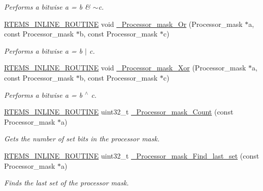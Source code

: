 \begin{DoxyCompactItemize}
\begin{DoxyCompactList}\small\item\em Performs a bitwise a = b \& $\sim$c. \end{DoxyCompactList}\item 
\mbox{\hyperlink{group__RTEMSScoreBaseDefs_gac216239df231d5dbd15e3520b0b9313f}{R\+T\+E\+M\+S\+\_\+\+I\+N\+L\+I\+N\+E\+\_\+\+R\+O\+U\+T\+I\+NE}} void \mbox{\hyperlink{group__RTEMSScoreProcessorMask_ga43996340f8cfb4a757aacec22f234719}{\+\_\+\+Processor\+\_\+mask\+\_\+\+Or}} (Processor\+\_\+mask $\ast$a, const Processor\+\_\+mask $\ast$b, const Processor\+\_\+mask $\ast$c)
\begin{DoxyCompactList}\small\item\em Performs a bitwise a = b $\vert$ c. \end{DoxyCompactList}\item 
\mbox{\hyperlink{group__RTEMSScoreBaseDefs_gac216239df231d5dbd15e3520b0b9313f}{R\+T\+E\+M\+S\+\_\+\+I\+N\+L\+I\+N\+E\+\_\+\+R\+O\+U\+T\+I\+NE}} void \mbox{\hyperlink{group__RTEMSScoreProcessorMask_ga5453b3340d17ad1912b3dea3945343fd}{\+\_\+\+Processor\+\_\+mask\+\_\+\+Xor}} (Processor\+\_\+mask $\ast$a, const Processor\+\_\+mask $\ast$b, const Processor\+\_\+mask $\ast$c)
\begin{DoxyCompactList}\small\item\em Performs a bitwise a = b $^\wedge$ c. \end{DoxyCompactList}\item 
\mbox{\hyperlink{group__RTEMSScoreBaseDefs_gac216239df231d5dbd15e3520b0b9313f}{R\+T\+E\+M\+S\+\_\+\+I\+N\+L\+I\+N\+E\+\_\+\+R\+O\+U\+T\+I\+NE}} uint32\+\_\+t \mbox{\hyperlink{group__RTEMSScoreProcessorMask_gae3fdc6e3c725a7ef67faf3bc5bd9697e}{\+\_\+\+Processor\+\_\+mask\+\_\+\+Count}} (const Processor\+\_\+mask $\ast$a)
\begin{DoxyCompactList}\small\item\em Gets the number of set bits in the processor mask. \end{DoxyCompactList}\item 
\mbox{\hyperlink{group__RTEMSScoreBaseDefs_gac216239df231d5dbd15e3520b0b9313f}{R\+T\+E\+M\+S\+\_\+\+I\+N\+L\+I\+N\+E\+\_\+\+R\+O\+U\+T\+I\+NE}} uint32\+\_\+t \mbox{\hyperlink{group__RTEMSScoreProcessorMask_gaed9f2ed311a025c27a2a70ca0eef53a9}{\+\_\+\+Processor\+\_\+mask\+\_\+\+Find\+\_\+last\+\_\+set}} (const Processor\+\_\+mask $\ast$a)
\begin{DoxyCompactList}\small\item\em Finds the last set of the processor mask. \end{DoxyCompactList}\item 

\end{DoxyCompactItemize}
